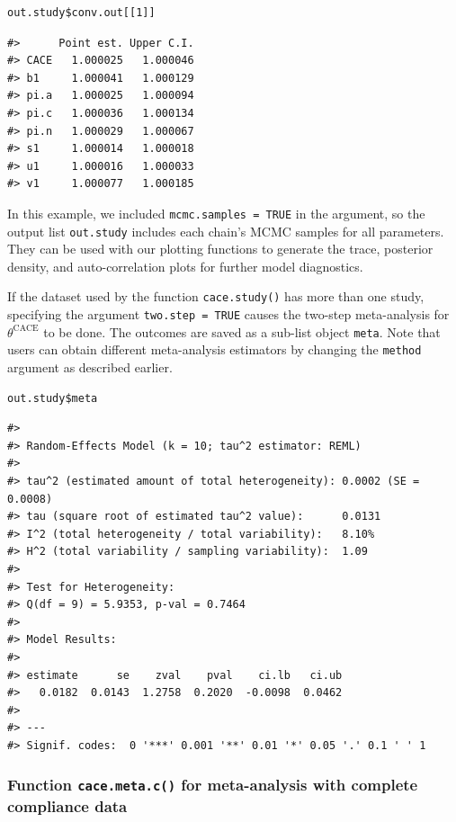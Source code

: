 \begin{verbatim}
out.study$conv.out[[1]]
\end{verbatim}

\begin{verbatim}
#>      Point est. Upper C.I.
#> CACE   1.000025   1.000046
#> b1     1.000041   1.000129
#> pi.a   1.000025   1.000094
#> pi.c   1.000036   1.000134
#> pi.n   1.000029   1.000067
#> s1     1.000014   1.000018
#> u1     1.000016   1.000033
#> v1     1.000077   1.000185
\end{verbatim}

In this example, we included \texttt{mcmc.samples\ =\ TRUE} in the argument, so the output list \texttt{out.study} includes each chain's MCMC samples for all parameters. They can be used with our plotting functions to generate the trace, posterior density, and auto-correlation plots for further model diagnostics.

If the dataset used by the function \texttt{cace.study()} has more than one study, specifying the argument \texttt{two.step\ =\ TRUE} causes the two-step meta-analysis for \(\theta^\text{CACE}\) to be done. The outcomes are saved as a sub-list object \texttt{meta}. Note that users can obtain different meta-analysis estimators by changing the \texttt{method} argument as described earlier.

\begin{verbatim}
out.study$meta
\end{verbatim}

\begin{verbatim}
#> 
#> Random-Effects Model (k = 10; tau^2 estimator: REML)
#> 
#> tau^2 (estimated amount of total heterogeneity): 0.0002 (SE = 0.0008)
#> tau (square root of estimated tau^2 value):      0.0131
#> I^2 (total heterogeneity / total variability):   8.10%
#> H^2 (total variability / sampling variability):  1.09
#> 
#> Test for Heterogeneity:
#> Q(df = 9) = 5.9353, p-val = 0.7464
#> 
#> Model Results:
#> 
#> estimate      se    zval    pval    ci.lb   ci.ub    
#>   0.0182  0.0143  1.2758  0.2020  -0.0098  0.0462    
#> 
#> ---
#> Signif. codes:  0 '***' 0.001 '**' 0.01 '*' 0.05 '.' 0.1 ' ' 1
\end{verbatim}

\hypertarget{function-cace.meta.c-for-meta-analysis-with-complete-compliance-data}{%
\subsubsection{\texorpdfstring{Function \texttt{cace.meta.c()} for meta-analysis with complete compliance data}{Function cace.meta.c() for meta-analysis with complete compliance data}}\label{function-cace.meta.c-for-meta-analysis-with-complete-compliance-data}}

